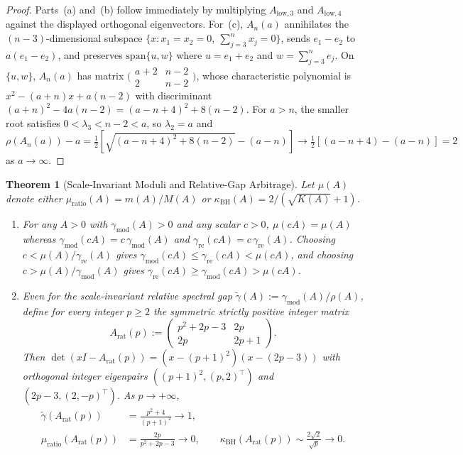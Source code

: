 \documentclass[11pt]{article}
\newtheorem{theorem}{Theorem}[section]
\theoremstyle{definition}
\begin{document}
\begin{proof}
Parts~(a) and~(b) follow immediately by multiplying $A_{\mathrm{low},3}$ and $A_{\mathrm{low},4}$ against the displayed orthogonal eigenvectors. For~(c), $A_n(a)$ annihilates the $(n - 3)$-dimensional subspace $\{x : x_1 = x_2 = 0,\ \sum_{j=3}^n x_j = 0\}$, sends $e_1 - e_2$ to $a(e_1 - e_2)$, and preserves $\mathrm{span}\{u, w\}$ where $u = e_1 + e_2$ and $w = \sum_{j=3}^n e_j$. On $\{u, w\}$, $A_n(a)$ has matrix $\bigl(\begin{smallmatrix} a+2 & n-2 \\ 2 & n-2 \end{smallmatrix}\bigr)$, whose characteristic polynomial is $x^2 - (a + n)x + a(n - 2)$ with discriminant $(a + n)^2 - 4a(n - 2) = (a - n + 4)^2 + 8(n - 2)$. For $a > n$, the smaller root satisfies $0 < \lambda_3 < n - 2 < a$, so $\lambda_2 = a$ and $\rho(A_n(a)) - a = \frac{1}{2}[\sqrt{(a - n + 4)^2 + 8(n - 2)} - (a - n)] \to \frac{1}{2}[(a - n + 4) - (a - n)] = 2$ as $a \to \infty$.
\end{proof}

\begin{theorem}[Scale-Invariant Moduli and Relative-Gap Arbitrage]\label{thm:ratio}
Let $\mu(A)$ denote either $\mu_{\mathrm{ratio}}(A) = m(A)/M(A)$ or $\kappa_{\mathrm{BH}}(A) = 2/(\sqrt{K(A)} + 1)$.
\begin{enumerate}
  \item[(a)] For any $A > 0$ with $\gamma_{\mathrm{mod}}(A) > 0$ and any scalar $c > 0$, $\mu(cA) = \mu(A)$ whereas $\gamma_{\mathrm{mod}}(cA) = c\,\gamma_{\mathrm{mod}}(A)$ and $\gamma_{\mathrm{re}}(cA) = c\,\gamma_{\mathrm{re}}(A)$. Choosing $c < \mu(A)/\gamma_{\mathrm{re}}(A)$ gives $\gamma_{\mathrm{mod}}(cA) \le \gamma_{\mathrm{re}}(cA) < \mu(cA)$, and choosing $c > \mu(A)/\gamma_{\mathrm{mod}}(A)$ gives $\gamma_{\mathrm{re}}(cA) \ge \gamma_{\mathrm{mod}}(cA) > \mu(cA)$.
  \item[(b)] Even for the scale-invariant relative spectral gap $\widetilde{\gamma}(A) := \gamma_{\mathrm{mod}}(A)/\rho(A)$, define for every integer $p \ge 2$ the symmetric strictly positive integer matrix
    \[
      A_{\mathrm{rat}}(p) := \begin{pmatrix} p^2 + 2p - 3 & 2p \\ 2p & 2p + 1 \end{pmatrix}.
    \]
    Then $\det(x I - A_{\mathrm{rat}}(p)) = (x - (p + 1)^2)(x - (2p - 3))$ with orthogonal integer eigenpairs $((p + 1)^2, (p, 2)^\top)$ and $(2p - 3, (2, -p)^\top)$. As $p \to +\infty$,
    \begin{align*}
      \widetilde{\gamma}(A_{\mathrm{rat}}(p)) &= \frac{p^2 + 4}{(p + 1)^2} \longrightarrow 1, \\
      \mu_{\mathrm{ratio}}(A_{\mathrm{rat}}(p)) &= \frac{2p}{p^2 + 2p - 3} \longrightarrow 0,
      \qquad
      \kappa_{\mathrm{BH}}(A_{\mathrm{rat}}(p)) \sim \frac{2\sqrt{2}}{\sqrt{p}} \longrightarrow 0.
    \end{align*}
\end{enumerate}
\end{theorem}
\end{document}
